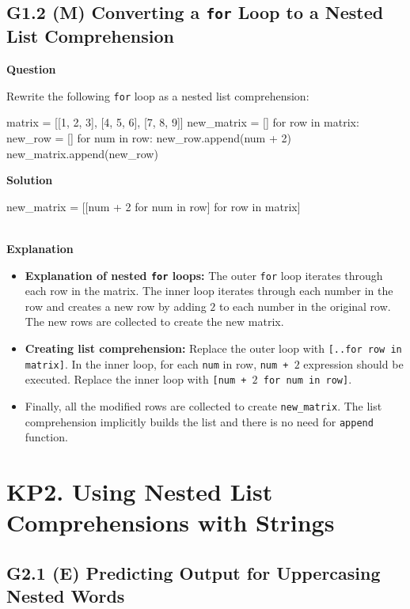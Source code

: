 \documentclass[10pt]{extarticle}
\begin{document}
\subsection*{G1.2 (M) Converting a \texttt{for} Loop to a Nested List Comprehension}

\textbf{Question}

Rewrite the following \texttt{for} loop as a nested list comprehension:  

    \begin{python}
    matrix = [[1, 2, 3], [4, 5, 6], [7, 8, 9]]
    new_matrix = []
    for row in matrix:
        new_row = []
        for num in row:
            new_row.append(num + 2)
        new_matrix.append(new_row)
    \end{python}

\noindent\textbf{Solution}

\begin{python}
new_matrix = [[num + 2 for num in row] for row in matrix]
\end{python}  \\

\noindent\textbf{Explanation}

\begin{itemize}
    \item \textbf{Explanation of nested \texttt{for} loops:} The outer \texttt{for} loop iterates through each row in the matrix.
    The inner loop iterates through each number in the row and creates a new row by adding $2$ to each number in the original row.
    The new rows are collected to create the new matrix. 
    \item \textbf{Creating list comprehension:} Replace the outer loop with \colorbox{gray!20}{\texttt{[..for row in matrix]}}. In the inner loop, for each \texttt{num} in row,  \colorbox{gray!20}{\texttt{num + $2$}} expression should be executed. Replace the inner loop  with \colorbox{gray!20}{\texttt{[num + $2$ for num in row]}}.
    \item Finally, all the modified rows are collected to create \texttt{new\_matrix}. The list comprehension implicitly builds the list and there is no need for  \colorbox{gray!20}{\texttt{append}} function.
   
   
\end{itemize}
\section*{KP2. Using Nested List Comprehensions with Strings}
\subsection*{G2.1 (E) Predicting Output for Uppercasing Nested Words}
\end{document}
